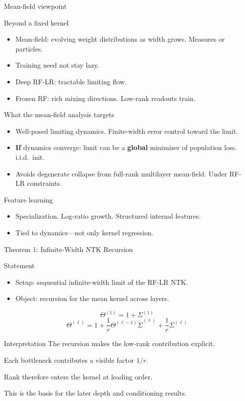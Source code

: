 \documentclass[aspectratio=169]{beamer}
\begin{document}
\begin{frame}{Mean-field viewpoint}
  \small
  \begin{block}{Beyond a fixed kernel}
    \begin{itemize}
      \item Mean-field: evolving weight distributions as width grows. Measures or particles.
      \item Training need not stay lazy.
      \item Deep RF-LR: tractable limiting flow.
      \item Frozen RF: rich mixing directions. Low-rank readouts train.
    \end{itemize}
  \end{block}
  \begin{exampleblock}{What the mean-field analysis targets}
    \begin{itemize}
      \item Well-posed limiting dynamics. Finite-width error control toward the limit.
      \item \textbf{If} dynamics converge: limit can be a \textbf{global} minimizer of population loss. i.i.d.\ init.
      \item Avoids degenerate collapse from full-rank multilayer mean-field. Under RF-LR constraints.
    \end{itemize}
  \end{exampleblock}
  \begin{alertblock}{Feature learning}
    \begin{itemize}
      \item Specialization. Log-ratio growth. Structured internal features.
      \item Tied to dynamics---not only kernel regression.
    \end{itemize}
  \end{alertblock}
\end{frame}

\begin{frame}{Theorem 1: Infinite-Width NTK Recursion}
  \small
  \begin{block}{Statement}
    \begin{itemize}
      \item Setup: sequential infinite-width limit of the RF-LR NTK.
      \item Object: recursion for the mean kernel across layers.
    \end{itemize}
    \[
    \Theta^{(1)}=1+\Sigma^{(1)}
    \]
    \[
    \Theta^{(\ell)}=1+\frac{1}{r}\Theta^{(\ell-1)}\dot{\Sigma}^{(\ell)}+\frac{1}{r}\Sigma^{(\ell)}
    \]
  \end{block}
  \begin{alertblock}{Interpretation}
    The recursion makes the low-rank contribution explicit.

    Each bottleneck contributes a visible factor $1/r$.

    Rank therefore enters the kernel at leading order.

    This is the basis for the later depth and conditioning results.
  \end{alertblock}
\end{frame}
\end{document}
